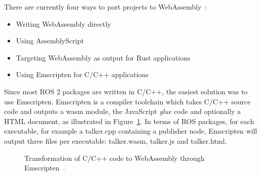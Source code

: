     There are currently four ways to port projects to WebAssembly~\cite{portingwasm}:
    
    \begin{itemize}
        \item Writing WebAssembly directly
        \item Using AssemblyScript
        \item Targeting WebAssembly as output for Rust applications
        \item Using Emscripten for C/C++ applications
    \end{itemize}

    Since most \ac{ROS} 2 packages are written in C/C++, the easiest solution was to use Emscripten. Emscripten is a compiler toolchain which takes C/C++ source code and outputs a wasm module, the JavaScript \textit{glue} code and optionally a \ac{HTML} document, as illustrated in Figure~\ref{fig:emscripten}. In terms of \ac{ROS} packages, for each executable, for example a \textsf{talker.cpp} containing a publisher node, Emscripten will output three files per executable: \textsf{talker.wasm}, \textsf{talker.js} and \textsf{talker.html}.

    \begin{figure}[htbp]
        \centering
        \caption{Transformation of C/C++ code to WebAssembly through Emscripten~\cite{portingwasm}.}
        \label{fig:emscripten}
    \end{figure}

